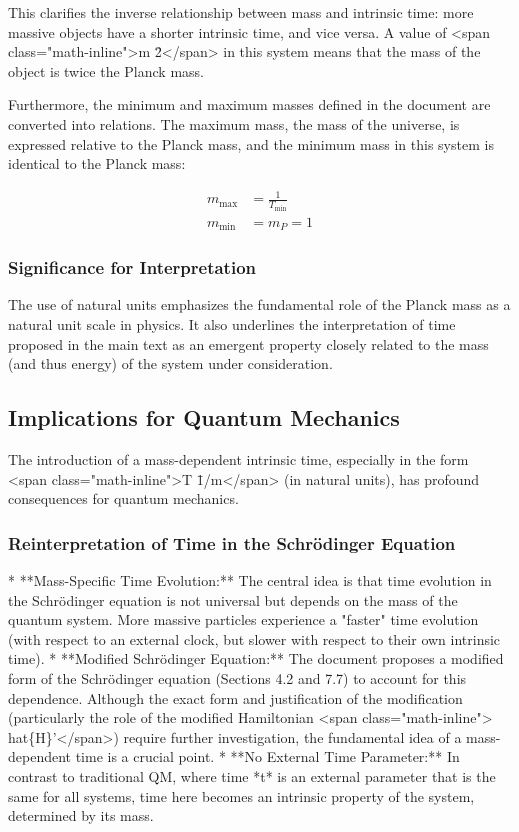 \documentclass{article}
\begin{document}
This clarifies the inverse relationship between mass and intrinsic time: more massive objects have a shorter intrinsic time, and vice versa. A value of <span class="math-inline">m \= 2</span> in this system means that the mass of the object is twice the Planck mass.

Furthermore, the minimum and maximum masses defined in the document are converted into relations. The maximum mass, the mass of the universe, is expressed relative to the Planck mass, and the minimum mass in this system is identical to the Planck mass:

\begin{align}
	m_{\text{max}} &= \frac{1}{T_{\text{min}}}\\
	m_{\text{min}} &= m_P = 1
\end{align}

\subsubsection{Significance for Interpretation}

The use of natural units emphasizes the fundamental role of the Planck mass as a natural unit scale in physics. It also underlines the interpretation of time proposed in the main text as an emergent property closely related to the mass (and thus energy) of the system under consideration.

\subsection{Implications for Quantum Mechanics}

The introduction of a mass-dependent intrinsic time, especially in the form <span class="math-inline">T \= 1/m</span> (in natural units), has profound consequences for quantum mechanics.

\subsubsection{Reinterpretation of Time in the Schrödinger Equation}

*   **Mass-Specific Time Evolution:** The central idea is that time evolution in the Schrödinger equation is not universal but depends on the mass of the quantum system. More massive particles experience a "faster" time evolution (with respect to an external clock, but slower with respect to their own intrinsic time).
*   **Modified Schrödinger Equation:** The document proposes a modified form of the Schrödinger equation (Sections 4.2 and 7.7) to account for this dependence. Although the exact form and justification of the modification (particularly the role of the modified Hamiltonian <span class="math-inline">\\hat\{H\}'</span>) require further investigation, the fundamental idea of a mass-dependent time is a crucial point.
*   **No External Time Parameter:** In contrast to traditional QM, where time *t* is an external parameter that is the same for all systems, time here becomes an intrinsic property of the system, determined by its mass.
\end{document}
